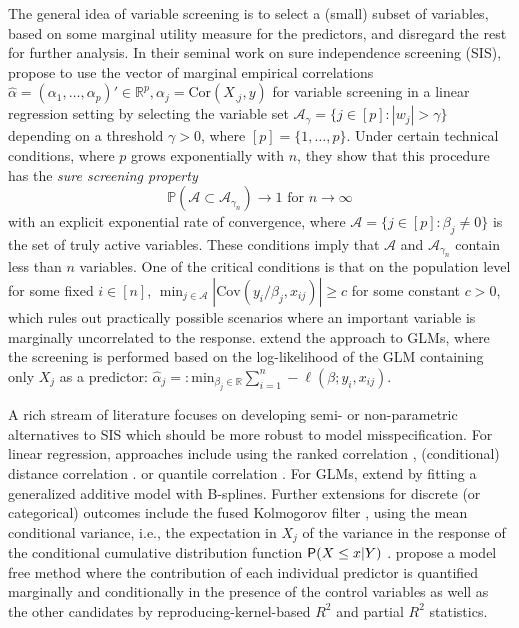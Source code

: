\documentclass[
  article]{jss}
\begin{document}
The general idea of variable screening is to select a (small) subset of
variables, based on some marginal utility measure for the predictors,
and disregard the rest for further analysis. In their seminal work on
sure independence screening (SIS), \citet{Fan2007SISforUHD} propose to
use the vector of marginal empirical correlations
\(\hat\alpha=(\alpha_1,\ldots ,\alpha_p)'\in\mathbb{R}^p,\alpha_j=\text{Cor}(X_{.j},y)\)
for variable screening in a linear regression setting by selecting the
variable set \(\mathcal{A}_\gamma = \{j\in [p]:|w_j|>\gamma\}\)
depending on a threshold \(\gamma>0\), where \([p]=\{1,\dots,p\}\).
Under certain technical conditions, where \(p\) grows exponentially with
\(n\), they show that this procedure has the \emph{sure screening
property} \[
\mathbb{P}(\mathcal{A} \subset \mathcal{A}_{\gamma_n})\to 1 \text{ for } n\to \infty
\] with an explicit exponential rate of convergence, where
\(\mathcal{A}=\{j\in[p]:\beta_j\neq 0\}\) is the set of truly active
variables. These conditions imply that \(\mathcal{A}\) and
\(\mathcal{A}_{\gamma_n}\) contain less than \(n\) variables. One of the
critical conditions is that on the population level for some fixed
\(i\in[n]\),
\(\min_{j\in\mathcal{A}}|\text{Cov}(y_i/\beta_j,x_{ij})| \geq c\) for
some constant \(c>0\), which rules out practically possible scenarios
where an important variable is marginally uncorrelated to the response.
\citet{Fan2010sisglms} extend the approach to GLMs, where the screening
is performed based on the log-likelihood of the GLM containing only
\(X_j\) as a predictor:
\(\hat\alpha_j=: \text{min}_{{\beta_j}\in\mathbb{R}}\sum_{i=1}^n -\ell(\beta;y_i,x_{ij})\).

A rich stream of literature focuses on developing semi- or
non-parametric alternatives to SIS which should be more robust to model
misspecification. For linear regression, approaches include using the
ranked correlation \citep{zhu2011model}, (conditional) distance
correlation \citep[@wang2015conditional]{li2012feature}. or quantile
correlation \citep{ma2016robust}. For GLMs, \citet{fan2011nonparametric}
extend \citet{Fan2010sisglms} by fitting a generalized additive model
with B-splines. Further extensions for discrete (or categorical)
outcomes include the fused Kolmogorov filter \citep{mai2013kolmogorov},
using the mean conditional variance, i.e., the expectation in \(X_j\) of
the variance in the response of the conditional cumulative distribution
function \(\mathsf{P}(X\leq x|Y)\) \citep{cui2015model}.
\citet{ke2023sufficient} propose a model free method where the
contribution of each individual predictor is quantified marginally and
conditionally in the presence of the control variables as well as the
other candidates by reproducing-kernel-based \(R^2\) and partial \(R^2\)
statistics.
\end{document}
